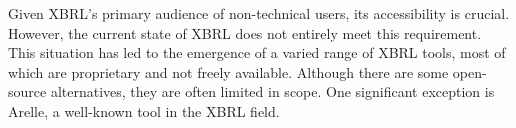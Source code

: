 Given XBRL's primary audience of non-technical users, its accessibility is crucial.
However, the current state of XBRL does not entirely meet this requirement.
This situation has led to the emergence of a varied range of XBRL tools,
most of which are proprietary and not freely available.
Although there are some open-source alternatives,
they are often limited in scope.
One significant exception is Arelle\cite{arelle}, a well-known tool in the XBRL field.



